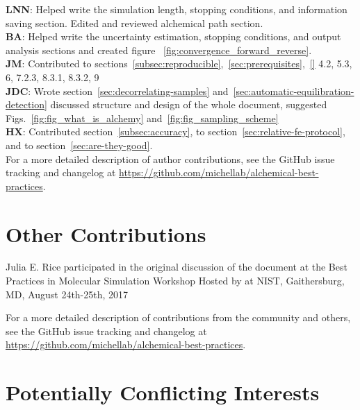 \documentclass[9pt,bestpractices]{livecoms}
\newcommand{\githubrepository}{\url{https://github.com/michellab/alchemical-best-practices}}  %
\begin{document}
\textbf{LNN}: Helped write the simulation length, stopping conditions, and information saving section. Edited and reviewed alchemical path section.\\
\textbf{BA}: Helped write the uncertainty estimation, stopping conditions, and output analysis sections and created figure ~\ref{fig:convergence_forward_reverse}.\\
\textbf{JM}: Contributed to sections~\ref{subsec:reproducible},~\ref{sec:prerequisites},~\ref{} 4.2, 5.3, 6, 7.2.3, 8.3.1, 8.3.2, 9\\
\textbf{JDC}: Wrote section~\ref{sec:decorrelating-samples} and~\ref{sec:automatic-equilibration-detection} discussed structure and design of the whole document, suggested Figs.~\ref{fig:fig_what_is_alchemy} and~\ref{fig:fig_sampling_scheme} \\
\textbf{HX}: Contributed section~\ref{subsec:accuracy}, to section~\ref{sec:relative-fe-protocol}, and to section~\ref{sec:are-they-good}.\\
For a more detailed description of author contributions,
see the GitHub issue tracking and changelog at \githubrepository.

\section*{Other Contributions}
%
Julia E. Rice participated in the original discussion of the document at the Best Practices in Molecular Simulation Workshop Hosted by at NIST, Gaithersburg, MD, August 24th-25th, 2017

For a more detailed description of contributions from the community and others, see the GitHub issue tracking and changelog at \githubrepository.


\section*{Potentially Conflicting Interests}
\end{document}
